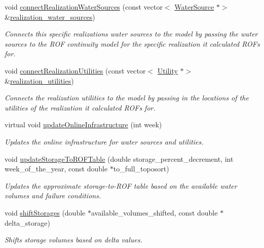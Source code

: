 \begin{DoxyCompactItemize}
void \mbox{\hyperlink{classContinuityModelROF_a0c12b5dad97c3783361baad7e53a2634}{connect\+Realization\+Water\+Sources}} (const vector$<$ \mbox{\hyperlink{classWaterSource}{Water\+Source}} $\ast$$>$ \&\mbox{\hyperlink{classContinuityModelROF_a77048d247b8d1f70fbdd31559b4d3337}{realization\+\_\+water\+\_\+sources}})
\begin{DoxyCompactList}\small\item\em Connects this specific realization\textquotesingle{}s water sources to the model by passing the water sources to the R\+OF continuity model for the specific realization it calculated R\+O\+Fs for. \end{DoxyCompactList}\item 
void \mbox{\hyperlink{classContinuityModelROF_abc16c650a854b60dfc42ab2d32ef4b0c}{connect\+Realization\+Utilities}} (const vector$<$ \mbox{\hyperlink{classUtility}{Utility}} $\ast$$>$ \&\mbox{\hyperlink{classContinuityModelROF_a75c6823d8dd37f274ee91ce158088dc4}{realization\+\_\+utilities}})
\begin{DoxyCompactList}\small\item\em Connects the realization utilities to the model by passing in the locations of the utilities of the realization it calculated R\+O\+Fs for. \end{DoxyCompactList}\item 
virtual void \mbox{\hyperlink{classContinuityModelROF_a06cf47a32d6793b0ee912deccf92fc5b}{update\+Online\+Infrastructure}} (int week)
\begin{DoxyCompactList}\small\item\em Updates the online infrastructure for water sources and utilities. \end{DoxyCompactList}\item 
void \mbox{\hyperlink{classContinuityModelROF_a28834584763c3aa27a6f0917aa68926f}{update\+Storage\+To\+R\+O\+F\+Table}} (double storage\+\_\+percent\+\_\+decrement, int week\+\_\+of\+\_\+the\+\_\+year, const double $\ast$to\+\_\+full\+\_\+toposort)
\begin{DoxyCompactList}\small\item\em Updates the approximate storage-\/to-\/\+R\+OF table based on the available water volumes and failure conditions. \end{DoxyCompactList}\item 
void \mbox{\hyperlink{classContinuityModelROF_a4f2b25687bcdeb4a88e22397c84789de}{shift\+Storages}} (double $\ast$available\+\_\+volumes\+\_\+shifted, const double $\ast$delta\+\_\+storage)
\begin{DoxyCompactList}\small\item\em Shifts storage volumes based on delta values. \end{DoxyCompactList}\item 

\end{DoxyCompactItemize}
